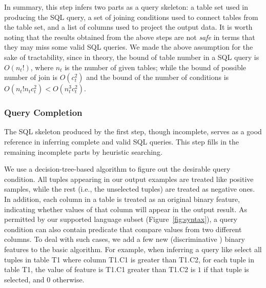 In summary, this step infers two parts as a query skeleton: a table set used in producing the SQL query, a set of joining conditions
used to connect tables from the table set, and a list of columns used to project the output data.
It is worth noting that the results obtained from the above steps are not \textit{safe} in
terms that they may miss some valid SQL queries. We made the above assumption for the sake of tractability,
since in theory, the bound of table number in a SQL query is $O(n_t!)$, where $n_t$ is the number of given tables;
while the bound of possible number of join is $O(c_t^2)$ and the bound of the number of conditions is $O(n_t!n_tc_t^2)<O(n_t^3c_t^2)$.





\subsubsection{Query Completion}
\label{sec:completion}

The SQL skeleton produced by the first step, though incomplete, serves as a good reference in inferring complete and valid SQL queries. This step fills in the remaining incomplete parts by heuristic searching.

We use a decision-tree-based \cite{Quinlan:1993} algorithm to figure out the
desirable query condition. All tuples appearing in our output examples are
treated like positive samples, while the rest (i.e., the unselected tuples)
are treated as negative ones. In addition, each column in a table is treated
as an original binary feature, indicating whether values of that column will appear in the
output result. As permitted by our supported language subset
(Figure~\ref{fig:syntax}), a query condition can also contain predicate that
 compare values from two different columns. To deal with such cases, we add
a few new (discriminative ) binary features to the basic algorithm. For example,
 when inferring a query like \textsf{select all tuples in table T1 where column
 T1.C1 is greater than T1.C2}, for each tuple in table T1, the value of feature
\textsf{is T1.C1 greater than T1.C2} is $1$ if that tuple is selected,
and $0$ otherwise. 


